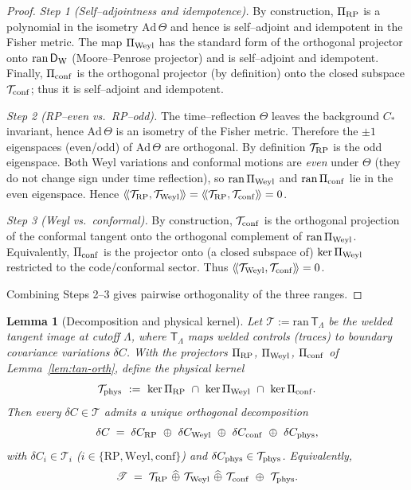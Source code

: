 \documentclass[10pt]{article}
\theoremstyle{definition}
\theoremstyle{plain}
\newtheorem{lemma}{Lemma}[section]
\begin{document}
\begin{proof}
\emph{Step 1 (Self–adjointness and idempotence).} By construction,
$\Pi_{\rm RP}$ is a polynomial in the isometry $\mathrm{Ad}\,\Theta$ and hence is self–adjoint
and idempotent in the Fisher metric. The map $\Pi_{\rm Weyl}$ has the standard form of the orthogonal
projector onto $\mathrm{ran}\,\mathsf D_{\rm W}$ (Moore–Penrose projector) and is self–adjoint
and idempotent. Finally, $\Pi_{\rm conf}$ is the orthogonal projector (by definition) onto the closed
subspace $\mathcal T_{\rm conf}$; thus it is self–adjoint and idempotent.

\emph{Step 2 (RP–even vs.\ RP–odd).} The time–reflection $\Theta$ leaves the background
$C_\ast$ invariant, hence $\mathrm{Ad}\,\Theta$ is an isometry of the Fisher metric. Therefore the
$\pm1$ eigenspaces (even/odd) of $\mathrm{Ad}\,\Theta$ are orthogonal. By definition
$\mathcal T_{\rm RP}$ is the odd eigenspace. Both Weyl variations and conformal
motions are \emph{even} under $\Theta$ (they do not change sign under time reflection),
so $\mathrm{ran}\,\Pi_{\rm Weyl}$ and $\mathrm{ran}\,\Pi_{\rm conf}$ lie in the even eigenspace.
Hence
$\langle\!\langle \mathcal T_{\rm RP},\mathcal T_{\rm Weyl}\rangle\!\rangle
=\langle\!\langle \mathcal T_{\rm RP},\mathcal T_{\rm conf}\rangle\!\rangle=0$.

\emph{Step 3 (Weyl vs.\ conformal).} By construction, $\mathcal T_{\rm conf}$ is the orthogonal
projection of the conformal tangent onto the orthogonal complement of $\mathrm{ran}\,\Pi_{\rm Weyl}$.
Equivalently, $\Pi_{\rm conf}$ is the projector onto (a closed subspace of)
$\ker \Pi_{\rm Weyl}$ restricted to the code/conformal sector. Thus
$\langle\!\langle \mathcal T_{\rm Weyl},\mathcal T_{\rm conf}\rangle\!\rangle=0$.

Combining Steps 2–3 gives pairwise orthogonality of the three ranges.
\end{proof}


\begin{lemma}[Decomposition and physical kernel]\label{lem:tan-complete}
Let $\mathscr T:=\mathrm{ran}\,\mathsf T_\Lambda$ be the welded tangent image at cutoff $\Lambda$,
where $\mathsf T_\Lambda$ maps welded controls (traces) to boundary covariance variations
$\delta C$. With the projectors $\Pi_{\rm RP}$, $\Pi_{\rm Weyl}$, $\Pi_{\rm conf}$ of
Lemma~\ref{lem:tan-orth}, define the \emph{physical kernel}
\[
\mathcal T_{\rm phys}\ :=\ \ker \Pi_{\rm RP}\ \cap\ \ker \Pi_{\rm Weyl}\ \cap\ \ker \Pi_{\rm conf}.
\]
Then every $\delta C\in\mathscr T$ admits a unique orthogonal decomposition
\begin{equation}\label{eq:orth-sum}
\delta C\;=\;\delta C_{\rm RP}\ \oplus\ \delta C_{\rm Weyl}\ \oplus\ \delta C_{\rm conf}\ \oplus\ \delta C_{\rm phys},
\end{equation}
with $\delta C_i\in\mathcal T_i$ ($i\in\{\mathrm{RP},\mathrm{Weyl},\mathrm{conf}\}$) and
$\delta C_{\rm phys}\in\mathcal T_{\rm phys}$. Equivalently,
\[
\mathscr T\;=\;\mathcal T_{\rm RP}\ \widehat\oplus\ \mathcal T_{\rm Weyl}\ \widehat\oplus\ \mathcal T_{\rm conf}
\ \oplus\ \mathcal T_{\rm phys}.
\]
\end{lemma}
\end{document}
